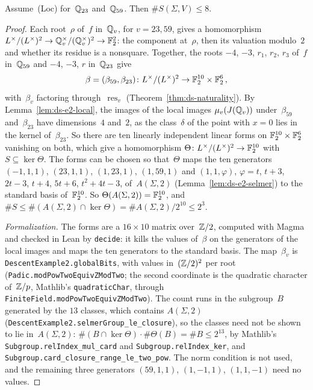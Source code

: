 \begin{proposition}
\label{prop:ds-e2-sel}
\leanok
{}
Assume~(Loc) for~$\mathbb{Q}_{23}$ and~$\mathbb{Q}_{59}$. Then $\#S(\Sigma, V) \le 8$.
\end{proposition}

\begin{proof}
\leanok
{}
Each root~$\rho$ of~$f$ in~$\mathbb{Q}_v$, for $v = 23, 59$, gives a homomorphism
$L^\times/(L^\times)^2 \to \mathbb{Q}_v^\times/(\mathbb{Q}_v^\times)^2 \to \mathbb{F}_2^2$: the component at~$\rho$, then
its valuation modulo~$2$ and whether its residue is a nonsquare. Together, the roots $-4$, $-3$,
$r_1$, $r_2$, $r_3$ of~$f$ in~$\mathbb{Q}_{59}$ and $-4$, $-3$, $r$ in~$\mathbb{Q}_{23}$ give
\[ \beta = (\beta_{59}, \beta_{23}) \colon L^\times/(L^\times)^2 \to \mathbb{F}_2^{10} \times
   \mathbb{F}_2^6\,, \]
with~$\beta_v$ factoring through~$\operatorname{res}_v$ (Theorem~\ref{thm:ds-naturality}). By
Lemma~\ref{lem:ds-e2-local}, the images of the local images $\mu_v(J(\mathbb{Q}_v))$ under~$\beta_{59}$
and~$\beta_{23}$ have dimensions~$4$ and~$2$, as the class~$\delta$ of the point with $x = 0$ lies
in the kernel of~$\beta_{23}$. So there are ten linearly independent linear forms on
$\mathbb{F}_2^{10} \times \mathbb{F}_2^6$ vanishing on both, which give a homomorphism
$\Theta \colon L^\times/(L^\times)^2 \to \mathbb{F}_2^{10}$ with $S \subseteq \ker\Theta$. The forms can
be chosen so that~$\Theta$ maps the ten generators $(-1, 1, 1)$, $(23, 1, 1)$, $(1, 23, 1)$,
$(1, 59, 1)$ and $(1, 1, \varphi)$, $\varphi = t$, $t + 3$, $2t - 3$, $t + 4$, $5t + 6$,
$t^2 + 4t - 3$, of~$A(\Sigma, 2)$ (Lemma~\ref{lem:ds-e2-selmer}) to the standard basis
of~$\mathbb{F}_2^{10}$. So $\Theta(A(\Sigma, 2)) = \mathbb{F}_2^{10}$, and
$\#S \le \#(A(\Sigma, 2) \cap \ker\Theta) = \#A(\Sigma, 2)/2^{10} \le 2^3$.

\emph{Formalization.} The forms are a $16 \times 10$ matrix over~$\mathbb{Z}/2$, computed with Magma and
checked in Lean by \texttt{decide}: it kills the values of~$\beta$ on the generators of the local
images and maps the ten generators to the standard basis. The map~$\beta_v$ is
\texttt{DescentExample2.globalBits}, with values in~$(\mathbb{Z}/2)^2$ per root
(\texttt{Padic.modPowTwoEquivZModTwo}; the second coordinate is the quadratic character
of~$\mathbb{Z}/p$, Mathlib's \texttt{quadraticChar}, through
\texttt{FiniteField.modPowTwoEquivZModTwo}). The count runs in the subgroup~$B$ generated by the
$13$ classes, which contains $A(\Sigma, 2)$ (\texttt{DescentExample2.selmerGroup\_le\_closure}), so
the classes need not be shown to lie in~$A(\Sigma, 2)$: $\#(B \cap \ker\Theta) \cdot
\#\Theta(B) = \#B \le 2^{13}$, by Mathlib's \texttt{Subgroup.relIndex\_mul\_card} and
\texttt{Subgroup.relIndex\_ker}, and \texttt{Subgroup.card\_closure\_range\_le\_two\_pow}. The norm
condition is not used, and the remaining three generators $(59, 1, 1)$, $(1, -1, 1)$,
$(1, 1, -1)$ need no values.
\end{proof}

